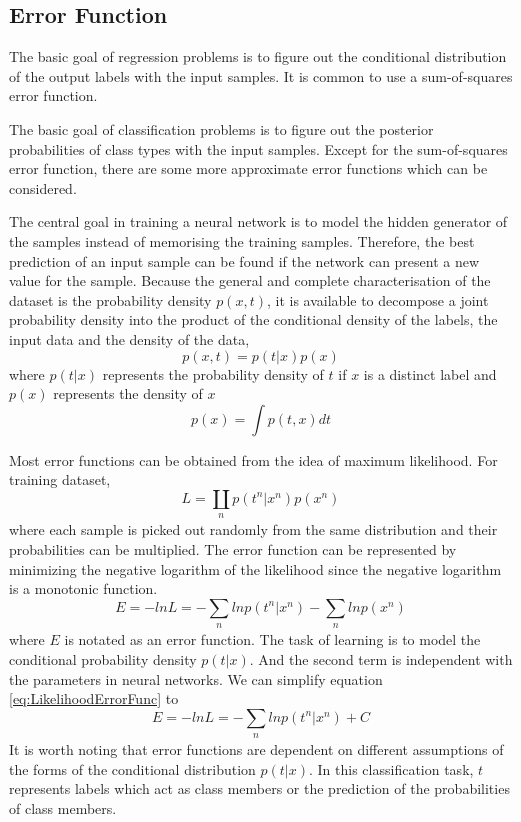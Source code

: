 \subsection{Error Function}

The basic goal of regression problems is to figure out the conditional distribution of the output labels with the input samples. It is common to use a sum-of-squares error function.

The basic goal of classification problems is to figure out the posterior probabilities of class types with the input samples. Except for the sum-of-squares error function, there are some more approximate error functions which can be considered.

The central goal in training a neural network is to model the hidden generator of the samples instead of memorising the training samples. Therefore, the best prediction of an input sample can be found if the network can present a new value for the sample. Because the general and complete characterisation of the dataset is the probability density $p(x,t)$, it is available to decompose a joint probability density into the product of the conditional density of the labels, the input data and the density of the data,
\begin{equation}\label{eq:JointProbDensity}
p(x,t) = p(t|x)p(x)
\end{equation}
where $p(t|x)$ represents the probability density of $t$ if $x$ is a distinct label and $p(x)$ represents the density of $x$
\begin{equation}\label{eq:ProbDensityX}
p(x) = \int p(t,x)dt
\end{equation}

Most error functions can be obtained from the idea of maximum likelihood. For training dataset, 
\begin{equation}\label{eq:LikelihoodLoss}
L = \coprod_{\substack{n}}  p(t^n|x^n)p(x^n)
\end{equation}
where each sample is picked out randomly from the same  distribution and their probabilities can be multiplied. The error function can be represented by minimizing the negative logarithm of the likelihood since the negative logarithm is a monotonic function.
\begin{equation}\label{eq:LikelihoodErrorFunc}
E = -ln L = -\sum_{\substack{n}} ln p(t^n|x^n) - \sum_{\substack{n}}lnp(x^n)
\end{equation}
where $E$ is notated as an error function. The task of learning is to model the conditional probability density $p(t|x)$. And the second term is independent with the parameters in neural networks.  We can simplify equation \ref{eq:LikelihoodErrorFunc} to
\begin{equation}\label{eq:SimLikelihoodErrorFunc}
E = -ln L = -\sum_{\substack{n}} ln p(t^n|x^n) + C
\end{equation}
It is worth noting that error functions are dependent on different assumptions of the forms of the conditional distribution $p(t|x)$. In this classification task, $t$ represents labels which act as class members or the prediction of the probabilities of class members.

